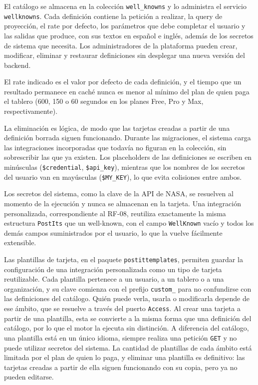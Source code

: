 El catálogo se almacena en la colección \texttt{well\_knowns} y lo administra el servicio \texttt{wellknowns}. Cada definición contiene la petición a realizar, la query de proyección, el rate por defecto, los parámetros que debe completar el usuario y las salidas que produce, con sus textos en español e inglés, además de los secretos de sistema que necesita. Los administradores de la plataforma pueden crear, modificar, eliminar y restaurar definiciones sin desplegar una nueva versión del backend.

El rate indicado es el valor por defecto de cada definición, y el tiempo que un resultado permanece en caché nunca es menor al mínimo del plan de quien paga el tablero (600, 150 o 60 segundos en los planes Free, Pro y Max, respectivamente).

La eliminación es lógica, de modo que las tarjetas creadas a partir de una definición borrada siguen funcionando. Durante las migraciones, el sistema carga las integraciones incorporadas que todavía no figuran en la colección, sin sobrescribir las que ya existen. Los placeholders de las definiciones se escriben en minúsculas (\texttt{\$credential}, \texttt{\$api\_key}), mientras que los nombres de los secretos del usuario van en mayúsculas (\texttt{\$MY\_KEY}), lo que evita colisiones entre ambos.

Los secretos del sistema, como la clave de la API de NASA, se resuelven al momento de la ejecución y nunca se almacenan en la tarjeta. Una integración personalizada, correspondiente al RF-08, reutiliza exactamente la misma estructura \texttt{PostIts} que un well-known, con el campo \texttt{WellKnown} vacío y todos los demás campos suministrados por el usuario, lo que la vuelve fácilmente extensible.

Las plantillas de tarjeta, en el paquete \texttt{postittemplates}, permiten guardar la configuración de una integración personalizada como un tipo de tarjeta reutilizable. Cada plantilla pertenece a un usuario, a un tablero o a una organización, y su clave comienza con el prefijo \texttt{custom\_} para no confundirse con las definiciones del catálogo. Quién puede verla, usarla o modificarla depende de ese ámbito, que se resuelve a través del puerto \texttt{Access}. Al crear una tarjeta a partir de una plantilla, esta se convierte a la misma forma que una definición del catálogo, por lo que el motor la ejecuta sin distinción. A diferencia del catálogo, una plantilla está en un único idioma, siempre realiza una petición \texttt{GET} y no puede utilizar secretos del sistema. La cantidad de plantillas de cada ámbito está limitada por el plan de quien lo paga, y eliminar una plantilla es definitivo: las tarjetas creadas a partir de ella siguen funcionando con su copia, pero ya no pueden editarse.

